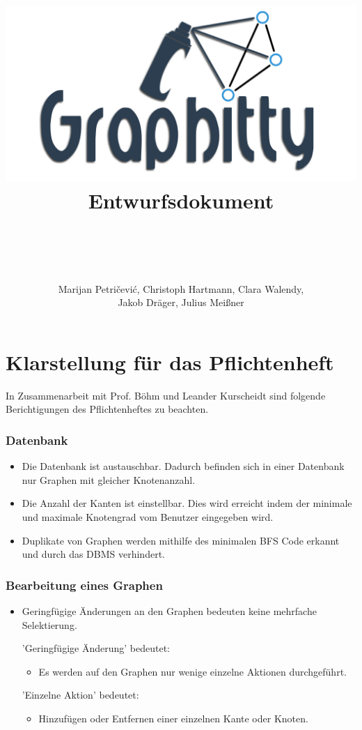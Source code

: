 \documentclass[13pt]{scrreprt}
\title{
	\includegraphics[scale=0.5,center]{OfficialLogo.png}
	\\
Entwurfsdokument
}
\author{\\ \\ \\ \\ Marijan Petričević, Christoph Hartmann, Clara Walendy,\\
	 Jakob Dräger, Julius Meißner}
\begin{document}
\maketitle

\tableofcontents

\chapter{Klarstellung für das Pflichtenheft}

In Zusammenarbeit mit Prof. Böhm und Leander Kurscheidt sind folgende Berichtigungen des Pflichtenheftes zu beachten.
\newline

\subsection{Datenbank}
	\begin{itemize} [label={}]
	\item Die Datenbank ist austauschbar. Dadurch befinden sich in einer Datenbank nur Graphen mit gleicher Knotenanzahl.
	\item Die Anzahl der Kanten ist einstellbar. Dies wird erreicht indem der minimale und maximale Knotengrad vom Benutzer eingegeben wird.
	\item Duplikate von Graphen werden mithilfe des minimalen BFS Code erkannt und durch das DBMS verhindert.
	\end{itemize}
	
\subsection{Bearbeitung eines Graphen}
	\begin{itemize} [label={}]
    \item Geringfügige Änderungen an den Graphen bedeuten keine mehrfache Selektierung.
    
	'Geringfügige Änderung' bedeutet:
	\begin{itemize} [label={}]
	\item Es werden auf den Graphen nur wenige einzelne Aktionen durchgeführt.
	\end{itemize}
	'Einzelne Aktion' bedeutet:
	\begin{itemize} [label={}]
	\item Hinzufügen oder Entfernen einer einzelnen Kante oder Knoten.
	\end{itemize}
	\end{itemize}
\end{document}
